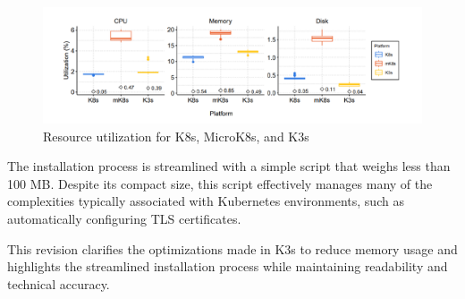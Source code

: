 \begin{figure}[ht]\centering
\includegraphics[scale=0.7]{Pictures/guido}
\caption{Resource utilization for K8s, MicroK8s, and K3s}\label{fig:guido}
\end{figure}

The installation process is streamlined with a simple script that weighs less than 100 MB. Despite its compact size, this script effectively manages many of the complexities typically associated with Kubernetes environments, such as automatically configuring TLS certificates.

This revision clarifies the optimizations made in K3s to reduce memory usage and highlights the streamlined installation process while maintaining readability and technical accuracy.


